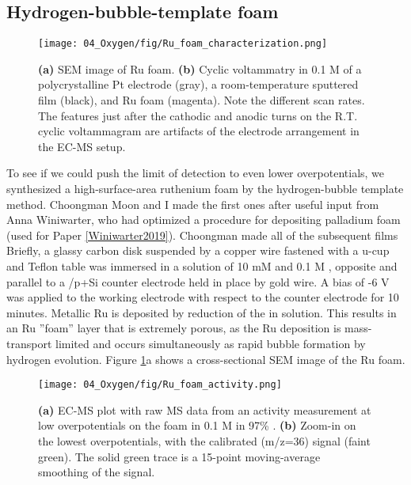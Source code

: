 \subsection{Hydrogen-bubble-template  foam}\label{subsec:Ru_foam}

\begin{figure}[h!]
	\centering
	\texttt{[image: 04\_Oxygen/fig/Ru\_foam\_characterization.png]}
	\caption{\textbf{(a)} SEM image of Ru foam. \textbf{(b)} Cyclic voltammatry in 0.1 M  of a polycrystalline Pt electrode (gray), a room-temperature sputtered  film (black), and Ru foam (magenta). Note the different scan rates. The features just after the cathodic and anodic turns on the R.T.  cyclic voltammagram are artifacts of the electrode arrangement in the EC-MS setup.}
	\label{fig:Ru_foam_char}
\end{figure}

To see if we could push the limit of  detection to even lower overpotentials, we synthesized a high-surface-area ruthenium foam by the hydrogen-bubble template method. Choongman Moon and I made the first ones after useful input from Anna Winiwarter, who had optimized a procedure for depositing palladium foam (used for Paper \ref{Winiwarter2019}). Choongman made all of the subsequent films Briefly, a glassy carbon disk suspended by a copper wire fastened with a u-cup and Teflon table was immersed in a solution of 10 mM  and 0.1 M , opposite and parallel to a /p+Si counter electrode held in place by gold wire. A bias of -6 V was applied to the working electrode with respect to the counter electrode for 10 minutes. Metallic Ru is deposited by reduction of the  in solution. This results in an Ru ''foam'' layer that is extremely porous, as the Ru deposition is mass-transport limited and occurs simultaneously as rapid bubble formation by hydrogen evolution. Figure \ref{fig:Ru_foam_char}a shows a cross-sectional SEM image of the Ru foam.

\begin{figure}[h!]
	\centering
	\texttt{[image: 04\_Oxygen/fig/Ru\_foam\_activity.png]}
	\caption{\textbf{(a)} EC-MS plot with raw MS data from an activity measurement at low overpotentials on the  foam in 0.1 M  in 97\% . \textbf{(b)} Zoom-in on the lowest overpotentials, with the calibrated  (m/z=36) signal (faint green). The solid green trace is a 15-point moving-average smoothing of the  signal.}
	\label{fig:Ru_foam_activity}
\end{figure}

